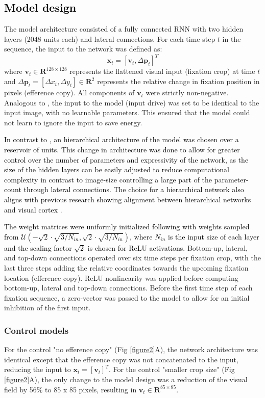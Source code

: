 \documentclass[10pt,letterpaper]{article}
\begin{document}
\subsection{\textcolor{black}{Model design}}
The model architecture consisted of a fully connected RNN with two hidden layers (2048 units each) and lateral connections. For each time step $t$ in the sequence, the input to the network was defined as: $$\mathbf{x}_t = [\mathbf{v}_t, \Delta \mathbf{p}_t]^T$$
where $\mathbf{v}_t \in \mathbf{R}^{128 \times 128}$ represents the flattened visual input (fixation crop) at time $t$ and $\Delta \mathbf{p}_t = [\Delta x_t, \Delta y_t] \in \mathbf{R}^2$ represents the relative change in fixation position in pixels (efference copy). All components of $\mathbf{v}_t$ were strictly non-negative. Analogous to \citet{ali_predictive_2022}, the input to the model (input drive) was set to be identical to the input image, with no learnable parameters. This ensured that the model could not learn to ignore the input to save energy.

\textcolor{black}{In contrast to \citet{ali_predictive_2022}, an hierarchical architecture of the model was chosen over a reservoir of units. This change in architecture was done to allow for greater control over the number of parameters and expressivity of the network, as the size of the hidden layers can be easily adjusted to reduce computational complexity in contrast to image-size controlling a large part of the parameter-count through lateral connections. The choice for a hierarchical network also aligns with previous research showing alignment between hierarchical networks and visual cortex \citep{yamins2014performance}.}

\textcolor{black}{The weight matrices were uniformly initialized following \cite{he_delving_2015} with weights sampled from $\mathcal{U}(-\sqrt{2} \cdot \sqrt{3/N_{in}}, \sqrt{2} \cdot \sqrt{3/N_{in}})$, where $N_{in}$ is the input size of each layer and the scaling factor $\sqrt{2}$ is chosen for ReLU activations.}
Bottom-up, lateral, and top-down connections operated over six time steps per fixation crop, with the last three steps adding the relative coordinates towards the upcoming fixation location (efference copy). ReLU nonlinearity was applied before computing bottom-up, lateral and top-down connections. Before the first time step of each fixation sequence, a zero-vector was passed to the model to allow for an initial inhibition of the first input.

\subsubsection{Control models}
For the control "no efference copy" (Fig \ref{figure2}A), the network architecture was identical except that the efference copy was not concatenated to the input, reducing the input to $\mathbf{x}_t = [\mathbf{v}_t]^T$. For the control "smaller crop size" (Fig \ref{figure2}A), the only change to the model design was a reduction of the visual field by 56\% to 85 x 85 pixels, resulting in $\mathbf{v}_t \in \mathbf{R}^{85 \times 85}$.
\end{document}
